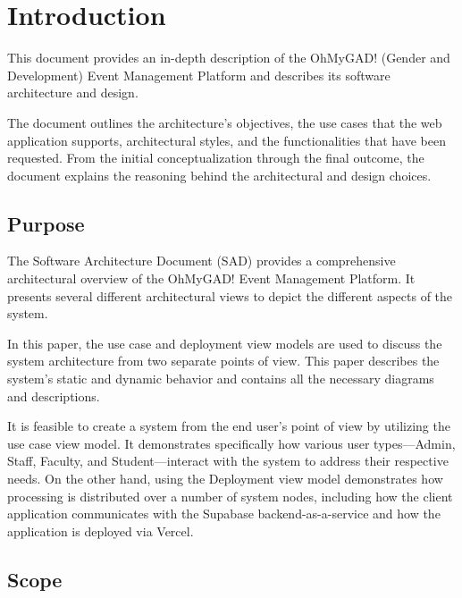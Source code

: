 \documentclass[11pt,a4paper]{article}
\begin{document}
\newpage

\thispagestyle{empty}
\vspace{2em}

\newpage
\tableofcontents
\newpage

\section{Introduction}
\label{sec:introduction}

This document provides an in-depth description of the OhMyGAD! (Gender and Development) Event Management Platform and describes its software architecture and design.

The document outlines the architecture's objectives, the use cases that the web application supports, architectural styles, and the functionalities that have been requested. From the initial conceptualization through the final outcome, the document explains the reasoning behind the architectural and design choices.


\subsection{Purpose}

The Software Architecture Document (SAD) provides a comprehensive architectural overview of the OhMyGAD! Event Management Platform. It presents several different architectural views to depict the different aspects of the system.

In this paper, the use case and deployment view models are used to discuss the system architecture from two separate points of view. This paper describes the system's static and dynamic behavior and contains all the necessary diagrams and descriptions.

It is feasible to create a system from the end user's point of view by utilizing the use case view model. It demonstrates specifically how various user types---Admin, Staff, Faculty, and Student---interact with the system to address their respective needs. On the other hand, using the Deployment view model demonstrates how processing is distributed over a number of system nodes, including how the client application communicates with the Supabase backend-as-a-service and how the application is deployed via Vercel.


\subsection{Scope}
\end{document}
